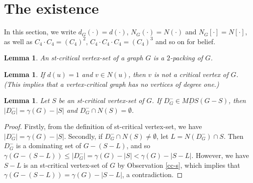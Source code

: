 \documentclass[a4paper,11pt]{article}
\numberwithin{equation}{section}
\newtheorem{lemma}[thm]{Lemma}
\begin{document}
\vspace{-4mm}
\section{The existence}

\vspace{-2mm}
In this section, we write $d_G(\cdot)=d(\cdot)$, $N_G(\cdot)=N(\cdot)$ and $N_G[\cdot]=N[\cdot]$, as well as $C_4\cdot C_4=(C_4)^2$, $C_4\cdot C_4\cdot C_4=(C_4)^3$ and so on for belief.

\begin{lemma}\label{cc-f}\emph{\cite{Zhao}}
An st-critical vertex-set of a graph $G$ is a $2$-packing of $G$.
\end{lemma}

\begin{lemma}\label{Th334}\emph{\cite{Wang3}}
 If $d(u)=1$ and $v\in N(u)$, then $v$ is not a  critical vertex of $G$. \emph{(This implies that a vertex-critical graph has no vertices of degree one.)}
\end{lemma}

\begin{lemma}\label{shd}\emph{\cite{Zhao}}
Let $S$ be an st-critical vertex-set of $G$. If $D^{-}_{G}\in \underline{MDS}(G-S)$, then $|D^{-}_{G}|=\gamma(G)-|S|$ and $D^{-}_{G}\cap N(S)=\emptyset$.
\end{lemma}

\begin{proof}
Firstly, from the definition of st-critical vertex-set, we have $|D^{-}_{G}|=\gamma(G)-|S|$. Secondly, if $D^{-}_{G}\cap N(S)\neq\emptyset$, let $L=N(D^{-}_{G})\cap  S$. Then $D^{-}_{G}$ is a dominating set of $G-(S-L)$, and so $\gamma(G-(S-L))\leq |D^{-}_{G}|=\gamma(G)-|S|<\gamma(G)-|S-L|$. However, we have $S-L$ is an st-critical vertex-set of $G$ by Observation \ref{cc-s}, which implies that $\gamma(G-(S-L))=\gamma(G)-|S-L|$, a contradiction.
\end{proof}
\end{document}
